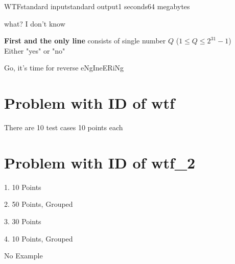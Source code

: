 \documentclass[11pt,a4paper]{article}
\begin{document}
\begin{problem}{WTF}{standard input}{standard output}{1 seconds}{64 megabytes}

what? I don't know

\InputFile

\textbf{First and the only line} consists of single number $Q$ ($1 \le Q \le 2^{31}-1$) \\ 

\OutputFile
Either "yes" or "no"

Go, it's time for reverse eNgIneERiNg

\Scoring

\section*{Problem with ID of wtf}

There are 10 test cases 10 points each

\section*{Problem with ID of wtf\_2}

1. 10 Points

2. 50 Points, Grouped

3. 30 Points

4. 10 Points, Grouped

\Examples

No Example

\end{problem}
\end{document}
